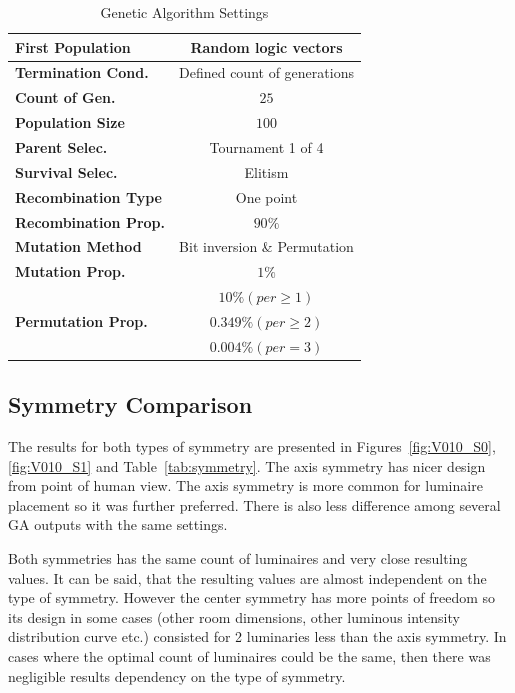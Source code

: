\begin{table}[htb]
	\renewcommand{\arraystretch}{1.3}
	\caption{Genetic Algorithm Settings}
 	\label{tab:GAsettings}
	\centering
  \begin{tabular}{| l | c |}
    \hline
    \textbf{First Population} & Random logic vectors \\
    \hline
    \textbf{Termination Cond.} & Defined count of generations \\
    \hline
		\textbf{Count of Gen.} & $25$ \\
    \hline
		\textbf{Population Size} & $100$ \\
	\hline
		\textbf{Parent Selec.} & Tournament 1 of 4 \\
    \hline
		\textbf{Survival Selec.} & Elitism \\
	\hline
		\textbf{Recombination Type} & One point \\
    \hline
		\textbf{Recombination Prop.} & $90 \%$ \\
	\hline
		\textbf{Mutation Method} & Bit inversion \& Permutation\\
	\hline
		\textbf{Mutation Prop.} & $1 \%$ \\
	\hline
		& $10 \% \left( per \geq 1\right)$\\
		\textbf{Permutation Prop.} &  $0.349 \% \left( per \geq 2\right)$ \\
		&$0.004 \% \left( per = 3\right)$\\
    \hline
  \end{tabular}
\end{table}

\subsection{Symmetry Comparison}

The results for both types of symmetry are presented in Figures~\ref{fig:V010_S0}, \ref{fig:V010_S1} and Table~\ref{tab:symmetry}. The axis symmetry has nicer design from point of human view. The axis symmetry is more common for luminaire placement so it was further preferred. There is also less difference among several GA outputs with the same settings.

Both symmetries has the same count of luminaires and very close resulting values. It can be said, that the resulting values are almost independent on the type of symmetry. However the center symmetry has more points of freedom so its design in some cases (other room dimensions, other luminous intensity distribution curve etc.) consisted for 2 luminaries less than the axis symmetry. In cases where the optimal count of luminaires could be the same, then there was negligible results dependency on the type of symmetry.

